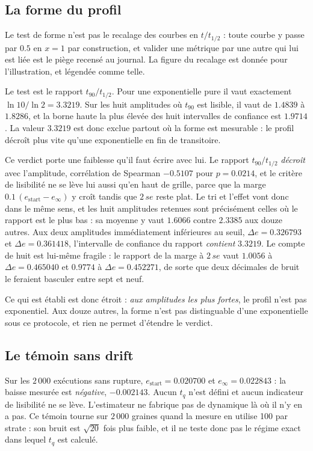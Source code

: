 \documentclass[11pt,a4paper]{article}
\begin{document}
\subsection{La forme du profil}

Le test de forme n'est pas le recalage des courbes en $t/t_{1/2}$ : toute courbe y passe par
$0.5$ en $x = 1$ par construction, et valider une métrique par une autre qui lui est liée est
le piège recensé au journal. La figure du recalage est donnée pour l'illustration, et
légendée comme telle.

Le test est le rapport $t_{90}/t_{1/2}$. Pour une exponentielle pure il vaut exactement
$\ln 10 / \ln 2 = 3.3219$. Sur les huit amplitudes où $t_{90}$ est lisible, il vaut de
$1.4839$ à $1.8286$, et la borne haute la plus élevée des huit intervalles de confiance est
$1.9714$. La valeur $3.3219$ est donc exclue partout où la forme est mesurable : le profil
décroît plus vite qu'une exponentielle en fin de transitoire.

Ce verdict porte une faiblesse qu'il faut écrire avec lui. Le rapport $t_{90}/t_{1/2}$
\emph{décroît} avec l'amplitude, corrélation de Spearman $-0.5107$ pour $p = 0.0214$, et le
critère de lisibilité ne se lève lui aussi qu'en haut de grille, parce que la marge
$0.1\,(e_{\mathrm{start}} - e_\infty)$ y croît tandis que $2\,se$ reste plat. Le tri et
l'effet vont donc dans le même sens, et les huit amplitudes retenues sont précisément celles
où le rapport est le plus bas : sa moyenne y vaut $1.6066$ contre $2.3385$ aux douze autres.
Aux deux amplitudes immédiatement inférieures au seuil, $\Delta e = 0.326793$ et
$\Delta e = 0.361418$, l'intervalle de confiance du rapport \emph{contient} $3.3219$. Le
compte de huit est lui-même fragile : le rapport de la marge à $2\,se$ vaut $1.0056$ à
$\Delta e = 0.465040$ et $0.9774$ à $\Delta e = 0.452271$, de sorte que deux décimales de
bruit le feraient basculer entre sept et neuf.

Ce qui est établi est donc étroit : \emph{aux amplitudes les plus fortes}, le profil n'est
pas exponentiel. Aux douze autres, la forme n'est pas distinguable d'une exponentielle sous
ce protocole, et rien ne permet d'étendre le verdict.

\subsection{Le témoin sans drift}

Sur les $2\,000$ exécutions sans rupture, $e_{\mathrm{start}} = 0.020700$ et
$e_\infty = 0.022843$ : la baisse mesurée est \emph{négative}, $-0.002143$. Aucun $t_q$ n'est
défini et aucun indicateur de lisibilité ne se lève. L'estimateur ne fabrique pas de
dynamique là où il n'y en a pas. Ce témoin tourne sur $2\,000$ graines quand la mesure en
utilise 100 par strate : son bruit est $\sqrt{20}$ fois plus faible, et il ne teste donc pas
le régime exact dans lequel $t_q$ est calculé.
\end{document}
